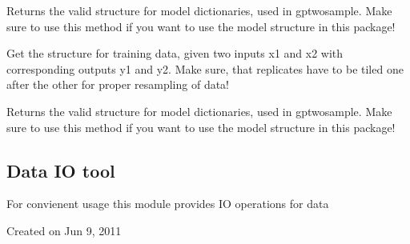 \documentclass[letterpaper,10pt,english]{sphinxmanual}
\begin{document}

\begin{fulllineitems}
\label{data:gptwosample.data.data_base.get_model_structure}
Returns the valid structure for model dictionaries, used in gptwosample.
Make sure to use this method if you want to use the model structure in this package!

\end{fulllineitems}


\begin{fulllineitems}
\label{data:gptwosample.data.data_base.get_training_data_structure}
Get the structure for training data, given two inputs x1 and x2
with corresponding outputs y1 and y2. Make sure, that replicates have
to be tiled one after the other for proper resampling of data!

\end{fulllineitems}


\begin{fulllineitems}
\label{data:gptwosample.data.data_base.has_model_structure}
Returns the valid structure for model dictionaries, used in gptwosample.
Make sure to use this method if you want to use the model structure in this package!

\end{fulllineitems}

\label{data:module-gptwosample.data.dataIO}

\subsection{Data IO tool}
\label{data:data-io-tool}
For convienent usage this module provides IO operations for data

Created on Jun 9, 2011
\end{document}
